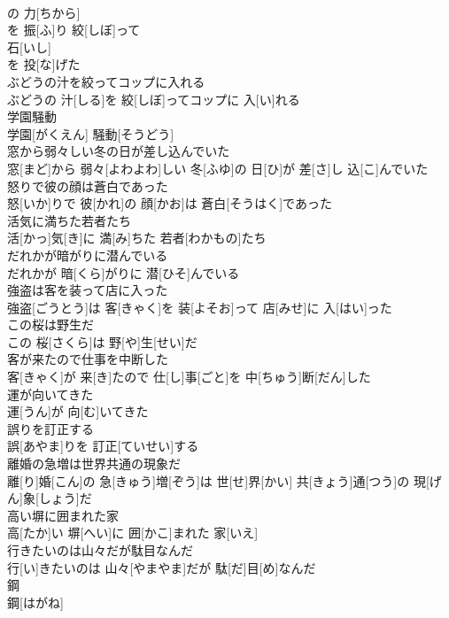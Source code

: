 \documentclass[8pt]{extreport}
\begin{document}
\begin{CJK}{UTF8}{min}
\\	の 力[ちから]
\\	を 振[ふ]り 絞[しぼ]って 
\\	石[いし]
\\	を 投[な]げた 
\\	ぶどうの汁を絞ってコップに入れる	
\\	ぶどうの 汁[しる]を 絞[しぼ]ってコップに 入[い]れる
\\	学園騒動	
\\	学園[がくえん] 騒動[そうどう]
\\	窓から弱々しい冬の日が差し込んでいた	
\\	窓[まど]から 弱々[よわよわ]しい 冬[ふゆ]の 日[ひ]が 差[さ]し 込[こ]んでいた
\\	怒りで彼の顔は蒼白であった	
\\	怒[いか]りで 彼[かれ]の 顔[かお]は 蒼白[そうはく]であった
\\	活気に満ちた若者たち	
\\	活[かっ]気[き]に 満[み]ちた 若者[わかもの]たち
\\	だれかが暗がりに潜んでいる	
\\	だれかが 暗[くら]がりに 潜[ひそ]んでいる
\\	強盗は客を装って店に入った	
\\	強盗[ごうとう]は 客[きゃく]を 装[よそお]って 店[みせ]に 入[はい]った
\\	この桜は野生だ	
\\	この 桜[さくら]は 野[や]生[せい]だ
\\	客が来たので仕事を中断した	
\\	客[きゃく]が 来[き]たので 仕[し]事[ごと]を 中[ちゅう]断[だん]した
\\	運が向いてきた	
\\	運[うん]が 向[む]いてきた
\\	誤りを訂正する	
\\	誤[あやま]りを 訂正[ていせい]する
\\	離婚の急増は世界共通の現象だ	
\\	離[り]婚[こん]の 急[きゅう]増[ぞう]は 世[せ]界[かい] 共[きょう]通[つう]の 現[げん]象[しょう]だ
\\	高い塀に囲まれた家	
\\	高[たか]い 塀[へい]に 囲[かこ]まれた 家[いえ]
\\	行きたいのは山々だが駄目なんだ	
\\	行[い]きたいのは 山々[やまやま]だが 駄[だ]目[め]なんだ
\\	鋼	
\\	鋼[はがね]

\end{CJK}
\end{document}
